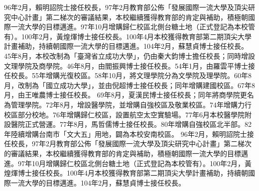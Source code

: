96年2月，賴明詔院士接任校長，97年2月教育部公佈「發展國際一流大學及頂尖研究中心計畫」第二梯次的審議結果，本校繼續獲得教育部的肯定與補助，積極朝國際一流大學的目標邁進。97年10月增購歸仁校區北側台糖土地（正式登記為本校管有）。100年2月，黃煌煇博士接任校長。100年4月本校獲得教育部第二期頂尖大學計畫補助，持續朝國際一流大學的目標邁進。104年2月，蘇慧貞博士接任校長。
45年8月，本校改制為「臺灣省立成功大學」，仍由秦大鈞博士擔任校長；同時增設文理學院及商學院。46年8月，由閻振興博士接任校長。54年1月，由羅雲平博士接任校長。55年增購光復校區。58年10月，將文理學院分為文學院及理學院。60年8月，改制為「國立成功大學」，並由倪超博士接任校長；同年增購建國校區。67年8月，由王唯農博士接任校長。
69年8月，夏漢民博士接任校長；同年將商學院更名為管理學院。72年8月，增設醫學院，並增購自強校區及敬業校區。74年增購力行校區部分校地。76年增購歸仁校區，設置航空太空實驗場。77年6月本校醫學院附設醫院正式營運。77年8月，馬哲儒博士接任校長。80年增購自強校區北半部。82年陸續增購台南市「文大五」用地，闢為本校安南校區。
96年2月，賴明詔院士接任校長，97年2月教育部公佈「發展國際一流大學及頂尖研究中心計畫」第二梯次的審議結果，本校繼續獲得教育部的肯定與補助，積極朝國際一流大學的目標邁進。97年10月增購歸仁校區北側台糖土地（正式登記為本校管有）。100年2月，黃煌煇博士接任校長。100年4月本校獲得教育部第二期頂尖大學計畫補助，持續朝國際一流大學的目標邁進。104年2月，蘇慧貞博士接任校長。

\EndChapter

